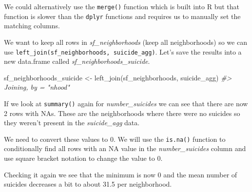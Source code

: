 \documentclass[
  12pt,
  openany]{book}
\newenvironment{Shaded}{\begin{snugshade}}{\end{snugshade}}
\newcommand{\CommentTok}[1]{\textcolor[rgb]{0.37,0.37,0.37}{\textit{#1}}}
\newcommand{\DecValTok}[1]{\textcolor[rgb]{0.06,0.06,0.06}{#1}}
\newcommand{\FunctionTok}[1]{\textcolor[rgb]{0,0,0}{#1}}
\newcommand{\NormalTok}[1]{#1}
\newcommand{\OtherTok}[1]{\textcolor[rgb]{0.37,0.37,0.37}{#1}}
\newcommand{\SpecialCharTok}[1]{\textcolor[rgb]{0,0,0}{#1}}
\begin{document}
We could alternatively use the \texttt{merge()} function which is built into R but that function is slower than the \texttt{dplyr} functions and requires us to manually set the matching columns.

We want to keep all rows in \emph{sf\_neighborhoods} (keep all neighborhoods) so we can use \texttt{left\_join(sf\_neighborhoods,\ suicide\_agg)}. Let's save the results into a new data.frame called \emph{sf\_neighborhoods\_suicide}.

\begin{Shaded}
\begin{Highlighting}[]
\NormalTok{sf\_neighborhoods\_suicide }\OtherTok{\textless{}{-}} \FunctionTok{left\_join}\NormalTok{(sf\_neighborhoods, suicide\_agg)}
\CommentTok{\#\textgreater{} Joining, by = "nhood"}
\end{Highlighting}
\end{Shaded}

If we look at \texttt{summary()} again for \emph{number\_suicides} we can see that there are now 2 rows with NAs. These are the neighborhoods where there were no suicides so they weren't present in the \emph{suicide\_agg} data.

\begin{Shaded}
\end{Shaded}

We need to convert these values to 0. We will use the \texttt{is.na()} function to conditionally find all rows with an NA value in the \emph{number\_suicides} column and use square bracket notation to change the value to 0.

\begin{Shaded}
\end{Shaded}

Checking it again we see that the minimum is now 0 and the mean number of suicides decreases a bit to about 31.5 per neighborhood.
\end{document}
